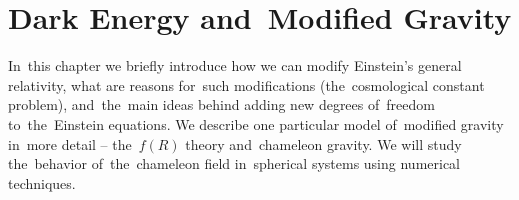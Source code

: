 \chapter{Dark Energy and~Modified Gravity}
\label{chpt:de_mg}
In~this chapter we briefly introduce how we can modify Einstein's general relativity, what are reasons for~such modifications (the~cosmological constant problem), and~the~main ideas behind adding new degrees of~freedom to~the~Einstein equations. We describe one particular model of~modified gravity in~more detail -- the~$f(R)$ theory and~chameleon gravity. We will study the~behavior of~the~chameleon field in~spherical systems using numerical techniques.


% 

% 

% 

% 